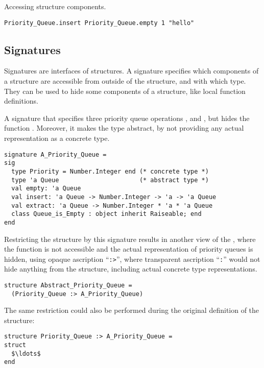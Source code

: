 \example Accessing structure components.
\begin{lstlisting}
Priority_Queue.insert Priority_Queue.empty 1 "hello"
\end{lstlisting}






\subsection{Signatures}

Signatures are interfaces of structures. A signature specifies which components of a structure are accessible from outside of the structure, and with which type. They can be used to hide some components of a structure, like local function definitions. 

\example A signature that specifies three priority queue operations ,  and , but hides the function . Moreover, it makes the  type abstract, by not providing any actual representation as a concrete type. 
\begin{lstlisting}
signature A_Priority_Queue =
sig
  type Priority = Number.Integer end (* concrete type *)
  type 'a Queue                      (* abstract type *)
  val empty: 'a Queue
  val insert: 'a Queue -> Number.Integer -> 'a -> 'a Queue
  val extract: 'a Queue -> Number.Integer * 'a * 'a Queue
  class Queue_is_Empty : object inherit Raiseable; end
end
\end{lstlisting}
Restricting the  structure by this signature results in another view of the , where the  function is not accessible and the actual representation of priority queues is hidden, using opaque ascription ``\lstinline!:>!'', where transparent ascription ``\lstinline!:!'' would not hide anything from the structure, including actual concrete type representations. 
\begin{lstlisting}
structure Abstract_Priority_Queue = 
  (Priority_Queue :> A_Priority_Queue)
\end{lstlisting}
The same restriction could also be performed during the original definition of the structure:
\begin{lstlisting}
structure Priority_Queue :> A_Priority_Queue =
struct 
  $\ldots$
end
\end{lstlisting}





